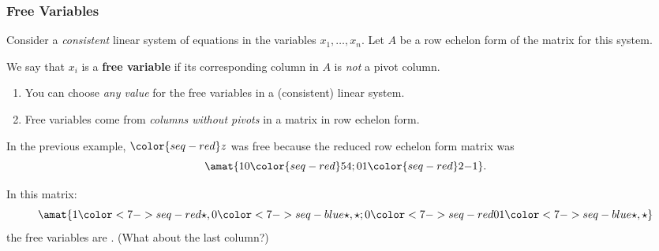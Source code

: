 
\begin{frame}
\frametitle{Free Variables}

\vskip-3mm
\begin{defn}
  Consider a \emph{consistent} linear system of equations in the variables
  $x_1,\ldots,x_n$.
  Let $A$ be a row echelon form of the matrix for this system.

  \pause\smallskip
  We say that $x_i$ is a \textbf{free variable} if its
  corresponding column in $A$ is \emph{not} a pivot column.
\end{defn}

\pause
\begin{bluebox}[Important]{.8\textwidth}
  \begin{enumerate}
  \item You can choose \emph{any value} for the free variables in a (consistent)
    linear system.
  \item<4-> Free variables come from \emph{columns without pivots\/} in a matrix
    in row echelon form.
  \end{enumerate}
\end{bluebox}

\pause[5]\vskip-2mm
In the previous example, $\color{seq-red}z$ was free because the reduced row echelon form
matrix was
\[ \amat{ 1 0 {\color{seq-red}5} 4 ; 0 1 {\color{seq-red}2} {-1}}. \]

\pause
In this matrix:
\[\amat{
1  \color<7->{seq-red}\star,  0  \color<7->{seq-blue}\star,  \star ;
0  \color<7->{seq-red}0   1  \color<7->{seq-blue}\star,  \star
}\]
the free variables are
.
\pause[8]%
(What about the last column?)

\end{frame}



